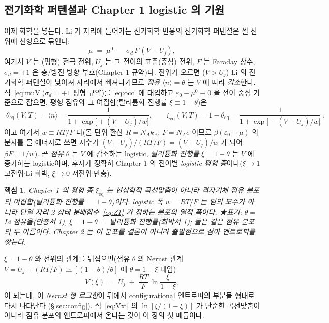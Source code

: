 \documentclass[11pt,a4paper]{article}
\newtheorem*{keybox}{핵심}
\newcommand{\eq}{\mathrm{eq}}
\newcommand{\kB}{k_{\mathrm B}}
\newcommand{\avg}[1]{\langle #1\rangle}
\begin{document}
\subsection{전기화학 퍼텐셜과 Chapter 1 logistic 의 기원}\label{ssec:logistic}
이제 화학을 넣는다. Li 가 자리에 들어가는 전기화학 반응의 전기화학 퍼텐셜은 셀 전위에 선형으로 묶인다:
\begin{equation}
\mu \;=\; \mu^0 \;-\; \sigma_d\,F\,(V-U_j),
\label{eq:muV}
\end{equation}
여기서 $V$ 는 (평형) 전극 전위, $U_j$ 는 그 전이의 표준(중심) 전위, $F$ 는 Faraday 상수, $\sigma_d=\pm1$ 은
충/방전 방향 부호(Chapter 1 규약)다. 전위가 오르면 ($V>U_j$) Li 의 전기화학 퍼텐셜이 낮아져 자리에서
빠져나가므로 \emph{점유} $\avg{n}=\theta$ 는 $V$ 에 따라 \emph{감소}한다. 식~\eqref{eq:muV}($\sigma_d=+1$ 평형
규약)를 \eqref{eq:occ} 에 대입하고 $\varepsilon_0-\mu^0\equiv0$ 을 전이 중심 기준으로 잡으면, 평형 점유와 그
여집합(탈리튬화 진행률 $\xi\equiv1-\theta$)은
\begin{equation}
\boxed{\;\theta_\eq(V,T)=\avg{n}=\frac{1}{1+\exp\!\bigl[+(V-U_j)/w\bigr]},\qquad
\xi_\eq(V,T)=1-\theta_\eq=\frac{1}{1+\exp\!\bigl[-(V-U_j)/w\bigr]}\;,}
\label{eq:logistic}
\end{equation}
이고 여기서 $w\equiv RT/F$ 다(몰 단위 환산 $R=N_A\kB$, $F=N_A e$ 이므로 $\beta(\varepsilon_0-\mu)$ 의 분자를
몰 에너지로 쓰면 지수가 $(V-U_j)/(RT/F)=(V-U_j)/w$ 가 되어 $\beta F=1/w$). 곧 \emph{점유} $\theta$ 는 $V$ 에
감소하는 logistic, \emph{탈리튬화 진행률} $\xi=1-\theta$ 는 $V$ 에 증가하는 logistic이며, 후자가 정확히
Chapter 1 의 전이별 \emph{logistic 평형 종}이다($\xi\to1$ 고전위$\cdot$Li 희박, $\xi\to0$ 저전위$\cdot$만충).

\begin{keybox}
Chapter 1 의 평형 종 $\xi_\eq$ 는 \emph{현상학적 곡선맞춤}이 아니라 \emph{격자기체 점유 분포의 여집합}(탈리튬화
진행률 $=1-\theta$)이다. logistic 폭 $w=RT/F$ 는 임의 모수가 아니라 단일 자리 2-상태 분배함수~\eqref{eq:Z1} 가
정하는 분포의 열적 폭이다. ★표기: $\theta=$ Li 점유율(만충서 1), $\xi=1-\theta=$ 탈리튬화 진행률(희박서 1);
둘은 같은 점유 분포의 두 이름이다. Chapter 2 는 이 분포를 결론이 아니라 출발점으로 삼아 엔트로피를 쌓는다.
\end{keybox}

$\xi=1-\theta$ 와 전위의 관계를 뒤집으면(점유 $\theta$ 의 Nernst 관계 $V=U_j+(RT/F)\ln[(1-\theta)/\theta]$ 에
$\theta=1-\xi$ 대입)
\begin{equation}
V(\xi) \;=\; U_j \;+\; \frac{RT}{F}\,\ln\!\frac{\xi}{1-\xi},
\label{eq:Vxi}
\end{equation}
이 되는데, 이 \emph{Nernst 형 로그항}이 뒤에서 configurational 엔트로피의 부분몰 형태로 다시 나타난다
(\S\ref{sec:config}). 식~\eqref{eq:Vxi} 의 $\ln[\xi/(1-\xi)]$ 가 단순한 곡선맞춤이 아니라 점유 분포의
엔트로피에서 온다는 것이 이 장의 첫 매듭이다.
\end{document}
